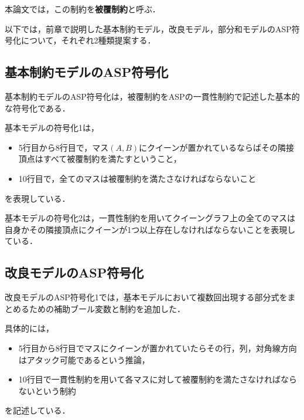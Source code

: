 本論文では，この制約を\textbf{被覆制約}と呼ぶ．\par
以下では，前章で説明した基本制約モデル，改良モデル，部分和モデルのASP符号化について，それぞれ2種類提案する．

\subsection{基本制約モデルのASP符号化}
基本制約モデルのASP符号化は，被覆制約をASPの一貫性制約で記述した基本的な符号化である．



基本モデルの符号化1は，
\begin{itemize}
 \item 5行目から8行目で，マス$(A,B)$にクイーンが置かれているならばその隣接頂点はすべて被覆制約を満たすということ，
 \item 10行目で，全てのマスは被覆制約を満たさなければならないこと
\end{itemize}
を表現している．

\newpage



基本モデルの符号化2は，一貫性制約を用いてクイーングラフ上の全てのマスは自身かその隣接頂点にクイーンが1つ以上存在しなければならないことを表現している．
\newpage
\subsection{改良モデルのASP符号化}


改良モデルのASP符号化1では，基本モデルにおいて複数回出現する部分式をまとめるための補助ブール変数と制約を追加した．\par
具体的には，\begin{itemize}
	     \item 5行目から8行目でマスにクイーンが置かれていたらその行，列，対角線方向はアタック可能であるという推論，
	     \item 10行目で一貫性制約を用いて各マスに対して被覆制約を満たさなければならないという制約
	    \end{itemize}
を記述している．

